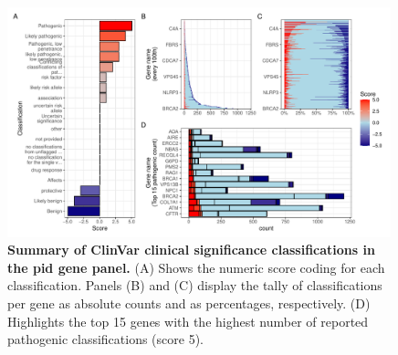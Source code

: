 \begin{figure}[ht]
  \centering
  \includegraphics[width=0.99\textwidth]{../images/p_varRisEst_summary_scores.pdf}
  \caption{\textbf{Summary of ClinVar clinical significance classifications in the \ac{pid} gene panel.} (A) Shows the numeric score coding for each classification. Panels (B) and (C) display the tally of classifications per gene as absolute counts and as percentages, respectively. (D) Highlights the top 15 genes with the highest number of reported pathogenic classifications (score 5).}
  \label{fig:p_varRisEst_summary_scores}
\end{figure}

